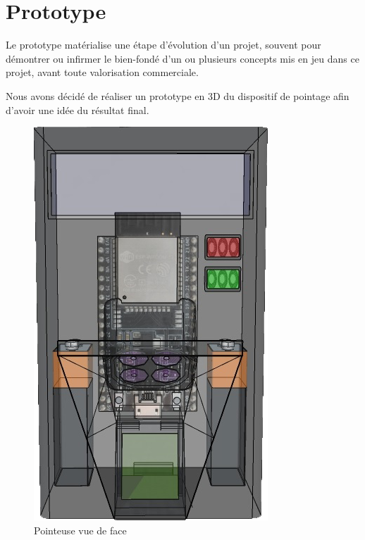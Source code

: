    
\section{Prototype}
Le prototype matérialise une étape d’évolution d’un projet, souvent pour 
démontrer ou infirmer le bien-fondé d’un ou plusieurs concepts mis en jeu 
dans ce projet, avant toute valorisation commerciale.

Nous avons décidé de réaliser un prototype en 3D du dispositif de pointage afin 
d’avoir une idée du résultat final.

\clearpage

    \begin{figure}[!htb]
       \begin{minipage}{0.5\textwidth}
         \centering
         \includegraphics[scale=0.6]{images/prototype/1.png}
         \caption{Pointeuse vue de face}\label{ }
       \end{minipage}\hfill
       \begin{minipage}{0.5\textwidth}
         \centering

\end{minipage}
\end{figure}

